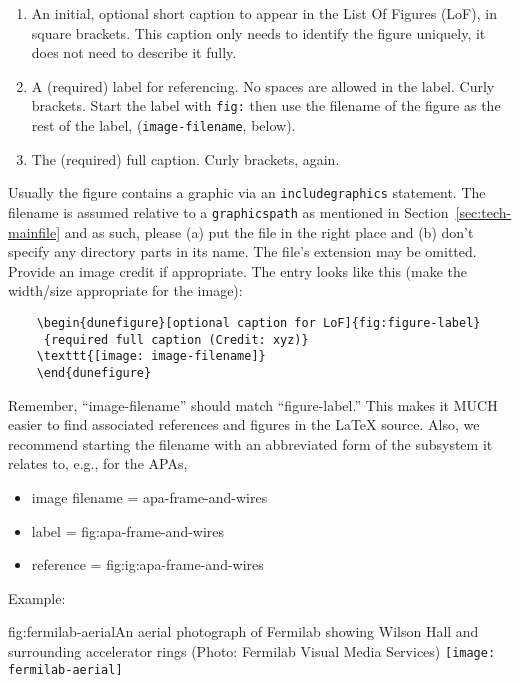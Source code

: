 \begin{enumerate}
\item An initial, optional short caption to appear in the List Of Figures (LoF), in square brackets. This caption only needs to
identify the figure uniquely, it does not need to describe it fully.
\item A (required) label for referencing. No spaces are allowed in the label. Curly brackets. Start the label with \texttt{fig:} then use the filename of the figure as the rest of the label, (\texttt{image-filename}, below). 
\item The (required) full caption. Curly brackets, again.
\end{enumerate}

Usually the figure contains a graphic via an \texttt{includegraphics} statement.
The filename is assumed relative to a \texttt{graphicspath} as
mentioned in Section~\ref{sec:tech-mainfile} and as such, please (a) put the file in the right place and (b) don't
 specify any directory parts in its name. 
The file's extension may be omitted. Provide an image credit if appropriate. The entry looks like this (make the width/size appropriate for the image):

\begin{verbatim}
    \begin{dunefigure}[optional caption for LoF]{fig:figure-label}
     {required full caption (Credit: xyz)}
    \texttt{[image: image-filename]}
    \end{dunefigure}
\end{verbatim}

Remember, ``image-filename'' should match ``figure-label.'' This makes it MUCH easier to find associated references and figures in the \LaTeX{}  source.  Also, we recommend starting the filename with an abbreviated form of the subsystem it relates to, e.g., for the APAs,

\begin{itemize}
\item image filename = apa-frame-and-wires
\item label = fig:apa-frame-and-wires
\item reference = fig:ig:apa-frame-and-wires
\end{itemize}

Example:
\begin{dunefigure}{fig:fermilab-aerial}{An aerial photograph of Fermilab
    showing Wilson Hall and surrounding accelerator rings (Photo: Fermilab
    Visual Media Services)}
  \texttt{[image: fermilab-aerial]}
\end{dunefigure}



